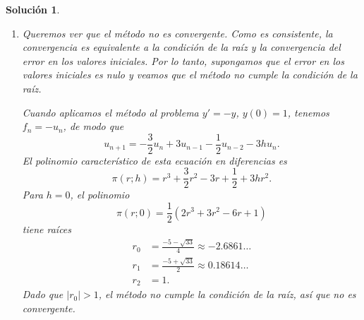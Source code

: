 \documentclass[11pt]{article}
\newtheorem*{sol}{Solución}
\begin{document}
\begin{sol}
\begin{enumerate}
\begin{align}
        &=
          \frac{1}{6}
          h^{4} y''''_n
          + O(h^{5})
      .\end{align}
      Por lo tanto, el error de truncamiento local
      $\tau_{n+1}=\epsilon_{n+1}/h$ es
      \begin{equation}
        \tau_{n+1}(h) = \frac{1}{6} h^{3} y^{(4)}_n + O(h^{4})
      .\end{equation}
      Luego, el método es de orden $3$ con constante de error
      $C_3=\frac{1}{6}$.
      En particular, suponiendo que $|y^{(4)}|<M$ en todo el
      intervalo, el método es consistente, pues
      \begin{equation}
        \tau(h) \leq \frac{1}{6} h^{3} M + O(h^{4}) \to 0
      \end{equation}
      cuando $h\to 0$.

    \item
      Queremos ver que el método no es convergente. Como es
      consistente, la convergencia es equivalente a la condición de la
      raíz y la convergencia del error en los valores iniciales.
      Por lo tanto, supongamos que el error en los valores iniciales
      es nulo y veamos que el método no cumple la condición de la
      raíz.

      Cuando aplicamos el método al problema $y'=-y$, $y(0)=1$,
      tenemos $f_n=-u_n$, de modo que
      \begin{equation}
        u_{n+1}
        = -\frac{3}{2}u_n + 3u_{n-1} - \frac{1}{2}u_{n-2} - 3hu_n
      .\end{equation}
      El polinomio característico de esta ecuación en diferencias es
      \begin{equation}
        \pi(r;h)
        =
        r^{3}
        + \frac{3}{2}r^2
        - 3r
        + \frac{1}{2}
        + 3hr^2
      .\end{equation}
      Para $h=0$, el polinomio
      \begin{equation}
        \pi(r;0)
        =\frac{1}{2}
          (
          2r^{3}
          + 3r^2
          - 6r
          + 1
          )
      \end{equation}
      tiene raíces
      \begin{align}
        r_0
        &=
        \frac{-5-\sqrt{33}}{4} \approx -2.6861\dots
        \\
        r_1
        &=
        \frac{-5+\sqrt{33}}{2} \approx 0.18614\dots
        \\
        r_2
        &= 1
      .\end{align}
      Dado que $|r_0|>1$, el método no cumple la condición de la raíz,
      así que no es convergente.
  \end{enumerate}
\end{sol}
\end{document}
